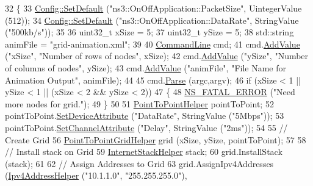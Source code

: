 \begin{DoxyCode}
32 \{
33   \hyperlink{group__config_ga2e7882df849d8ba4aaad31c934c40c06}{Config::SetDefault} (\textcolor{stringliteral}{"ns3::OnOffApplication::PacketSize"}, UintegerValue (512));
34   \hyperlink{group__config_ga2e7882df849d8ba4aaad31c934c40c06}{Config::SetDefault} (\textcolor{stringliteral}{"ns3::OnOffApplication::DataRate"}, StringValue (\textcolor{stringliteral}{"500kb/s"}));
35 
36   uint32\_t xSize = 5;
37   uint32\_t ySize = 5;
38   std::string animFile = \textcolor{stringliteral}{"grid-animation.xml"};
39 
40   \hyperlink{classns3_1_1CommandLine}{CommandLine} cmd;
41   cmd.\hyperlink{classns3_1_1CommandLine_addcfb546c7ad4c8bd0965654d55beb8e}{AddValue} (\textcolor{stringliteral}{"xSize"}, \textcolor{stringliteral}{"Number of rows of nodes"}, xSize);
42   cmd.\hyperlink{classns3_1_1CommandLine_addcfb546c7ad4c8bd0965654d55beb8e}{AddValue} (\textcolor{stringliteral}{"ySize"}, \textcolor{stringliteral}{"Number of columns of nodes"}, ySize);
43   cmd.\hyperlink{classns3_1_1CommandLine_addcfb546c7ad4c8bd0965654d55beb8e}{AddValue} (\textcolor{stringliteral}{"animFile"},  \textcolor{stringliteral}{"File Name for Animation Output"}, animFile);
44 
45   cmd.\hyperlink{classns3_1_1CommandLine_a5c10b85b3207e5ecb48d907966923156}{Parse} (argc,argv);
46   \textcolor{keywordflow}{if} (xSize < 1 || ySize < 1 || (xSize < 2 && ySize < 2))
47     \{
48       \hyperlink{group__fatal_ga5131d5e3f75d7d4cbfd706ac456fdc85}{NS\_FATAL\_ERROR} (\textcolor{stringliteral}{"Need more nodes for grid."});
49     \}
50 
51   \hyperlink{classns3_1_1PointToPointHelper}{PointToPointHelper} pointToPoint;
52   pointToPoint.\hyperlink{classns3_1_1PointToPointHelper_a4577f5ab8c387e5528af2e0fbab1152e}{SetDeviceAttribute} (\textcolor{stringliteral}{"DataRate"}, StringValue (\textcolor{stringliteral}{"5Mbps"}));
53   pointToPoint.\hyperlink{classns3_1_1PointToPointHelper_a6b5317fd17fb61e5a53f8d66a90b63b9}{SetChannelAttribute} (\textcolor{stringliteral}{"Delay"}, StringValue (\textcolor{stringliteral}{"2ms"}));
54 
55   \textcolor{comment}{// Create Grid}
56   \hyperlink{classns3_1_1PointToPointGridHelper}{PointToPointGridHelper} grid (xSize, ySize, pointToPoint);
57 
58   \textcolor{comment}{// Install stack on Grid}
59   \hyperlink{classns3_1_1InternetStackHelper}{InternetStackHelper} stack;
60   grid.InstallStack (stack);
61 
62   \textcolor{comment}{// Assign Addresses to Grid}
63   grid.AssignIpv4Addresses (\hyperlink{classns3_1_1Ipv4AddressHelper}{Ipv4AddressHelper} (\textcolor{stringliteral}{"10.1.1.0"}, \textcolor{stringliteral}{"255.255.255.0"}),

\end{DoxyCode}
